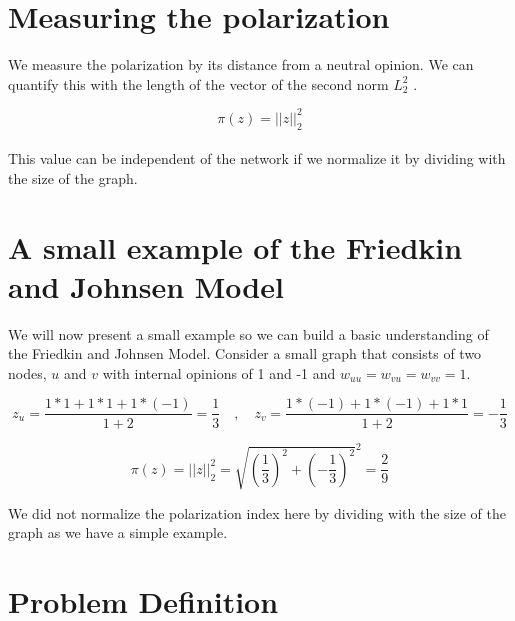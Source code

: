 \section{Measuring the polarization}
\label{sec:meas}

We measure the polarization by its distance from a neutral opinion. We can quantify this with the length of the vector of the second norm $L_{2}^2$ \cite{tsapMatakosTerzi}.

\begin{equation}
	\pi(z) = ||z||_{2}^2
\end{equation}
\\
This value can be independent of the network if we normalize it by dividing with the size of the graph.


\section{A small example of the Friedkin and Johnsen Model}
\label{sec:example}
We will now present a small example so we can build a basic understanding of the Friedkin and Johnsen Model. Consider a small graph that consists of two nodes, $u$ and $v$ with internal opinions of 1 and -1 and $w_{uu} = w_{vu} = w_{vv} = 1$.

\begin{equation} 
	 z_u = \frac{1*1 + 1*1 + 1*(-1)}{1 + 2} = \frac{1}{3} \quad, \quad
	 z_v = \frac{1*(-1) + 1*(-1) + 1*1}{1 + 2} = -\frac{1}{3}
\end{equation}

\begin{equation}
	\pi(z) = ||z||_{2}^2 = \sqrt{(\frac{1}{3})^2 + (-\frac{1}{3})^2}^2 = \frac{2}{9}			   
\end{equation}

We did not normalize the polarization index here by dividing with the size of the graph as we have a simple example.

\section{Problem Definition}
\label{sec:problemDef}

